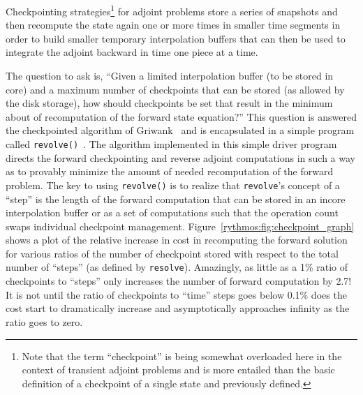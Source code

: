 \documentclass[pdf,ps2pdf,11pt]{SANDreport}
\begin{document}
Checkpointing strategies\footnote{Note that the term ``checkpoint'' is being
somewhat overloaded here in the context of transient adjoint problems and is
more entailed than the basic definition of a checkpoint of a single state and
previously defined.} for adjoint problems store a series of snapshots and then
recompute the state again one or more times in smaller time segments in order
to build smaller temporary interpolation buffers that can then be used to
integrate the adjoint backward in time one piece at a time.

The question to ask is, ``Given a limited interpolation buffer (to be stored
in core) and a maximum number of checkpoints that can be stored (as allowed by
the disk storage), how should checkpoints be set that result in the minimum
about of recomputation of the forward state equation?''  This question is
answered the checkpointed algorithm of Griwank~\cite{347846} and is
encapsulated in a simple program called {}\texttt{revolve()}~\cite{347846}.
The algorithm implemented in this simple driver program directs the forward
checkpointing and reverse adjoint computations in such a way as to provably
minimize the amount of needed recomputation of the forward problem.  The key
to using {}\texttt{revolve()} is to realize that {}\texttt{revolve}'s concept
of a ``step'' is the length of the forward computation that can be stored in
an incore interpolation buffer or as a set of computations such that the
operation count swaps individual checkpoint management.
Figure~\ref{rythmos:fig:checkpoint_graph} shows a plot of the relative
increase in cost in recomputing the forward solution for various ratios of the
number of checkpoint stored with respect to the total number of ``steps'' (as
defined by {}\texttt{resolve}).  Amazingly, as little as a 1\% ratio of
checkpoints to ``steps'' only increases the number of forward computation by
2.7!  It is not until the ratio of checkpoints to ``time'' steps goes below
0.1\% does the cost start to dramatically increase and asymptotically
approaches infinity as the ratio goes to zero.
\end{document}
